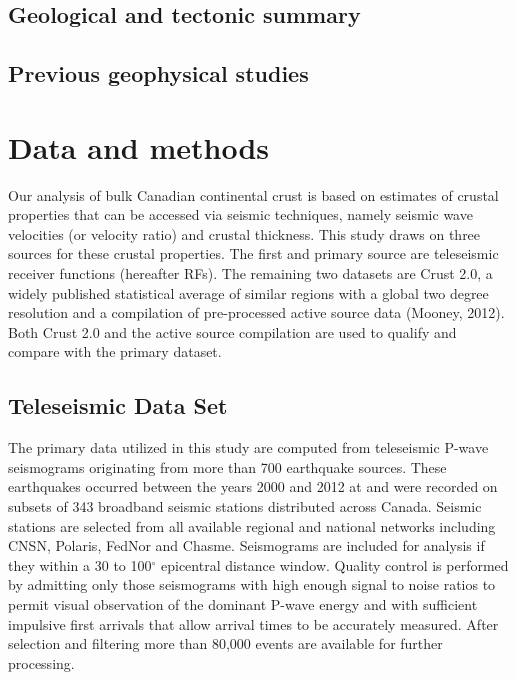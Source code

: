 \documentclass[draft, 12pt]{article}
\begin{document}
\subsection{Geological and tectonic summary}


\subsection{Previous geophysical studies}

\section{Data and methods}
Our analysis of bulk Canadian continental crust is based on estimates of crustal properties that can be accessed via seismic techniques, namely seismic wave velocities (or velocity ratio) and crustal thickness. This study draws on three sources for these crustal properties. The first and primary source are teleseismic receiver functions (hereafter RFs). The remaining two datasets are Crust 2.0, a widely published statistical average of similar regions with a global two degree resolution and a compilation of pre-processed active source data (Mooney, 2012). Both Crust 2.0 and the active source compilation are used to qualify and compare with the primary dataset.

\subsection{Teleseismic Data Set}
The primary data utilized in this study are computed from teleseismic P-wave seismograms originating from more than 700 earthquake sources. These earthquakes occurred between the years 2000 and 2012 at and were recorded on subsets of 343 broadband seismic stations distributed across Canada. Seismic stations are selected from all available regional and national networks including CNSN, Polaris, FedNor and Chasme. Seismograms are included for analysis if they within a 30 to 100$^\circ$ epicentral distance window. Quality control is performed by admitting only those seismograms with high enough signal to noise ratios to permit visual observation of the dominant P-wave energy and with sufficient impulsive first arrivals that allow arrival times to be accurately measured. After selection and filtering more than 80,000 events are available for further processing.
\end{document}
